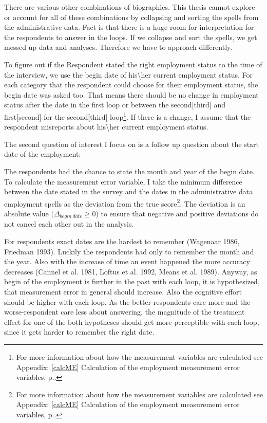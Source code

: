 There are various other combinations of biographies. This thesis cannot explore or account for all of these combinations by collapsing and sorting the spells from the administrative data. Fact is that there is a huge room for interpretation for the respondents to answer in the loops. If we collapse and sort the spells, we get messed up data and analyses. Therefore we have to approach differently.

To figure out if the Respondent stated the right employment status to the time of the interview, we use the begin date of his\textbackslash her current employment status. For each category that the respondent could choose for their employment status, the begin date was asked too. That means there should be no change in employment status after the date in the first loop or between the second[third] and first[second] for the second[third] loop\footnote{For more information about how the measurement variables are calculated see Appendix: \ref{calcME} Calculation of the employment measurement error variables, p.\pageref{calcME}.}. If there is a change, I assume that the respondent misreports about his\textbackslash her current employment status.

The second question of interest I focus on is a follow up question about the start date of the employment: 

The respondents had the chance to state the month and year of the begin date. To calculate the measurement error variable, I take the minimum difference between the date stated in the survey and the dates in the administrative data employment spells as the deviation from the true score\footnote{For more information about how the measurement variables are calculated see Appendix: \ref{calcME} Calculation of the employment measurement error variables, p.\pageref{calcME}.}. The deviation is an absolute value \((\Delta_{begin \ date}\geq0\)) to ensure that negative and positive deviations do not cancel each other out in the analysis.

For respondents exact dates are the hardest to remember (Wagenaar 1986, Friedman 1993). Luckily the respondents had only to remember the month and the year. Also with the increase of time an event happened the more accuracy decreases (Cannel et al. 1981, Loftus et al. 1992, Means et al. 1989). Anyway, as begin of the employment is further in the past with each loop, it is hypothesized, that measurement error in general should increase. Also the cognitive effort should be higher with each loop. As the better-respondents care more and the worse-respondent care less about answering, the magnitude of the treatment effect for one of the both hypotheses should get more perceptible with each loop, since it gets harder to remember the right date.

